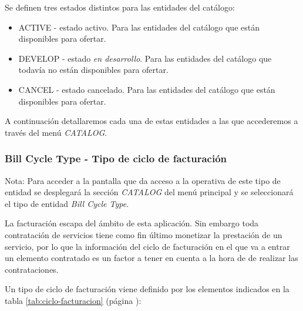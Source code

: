 Se definen tres estados distintos para las entidades del catálogo:

\begin{itemize}
\item ACTIVE - estado activo. Para las entidades del catálogo que están disponibles para ofertar.
\item DEVELOP - estado \textit{en desarrollo}. Para las entidades del catálogo que todavía no están disponibles para ofertar.
\item CANCEL - estado cancelado. Para las entidades del catálogo que están disponibles para ofertar.
\end{itemize}



A continuación detallaremos cada una de estas entidades a las que accederemos a través del menú \emph{CATALOG}.

\subsubsection{Bill Cycle Type - Tipo de ciclo de facturación}
\label{sub:billcycle}

Nota: Para acceder a la pantalla que da acceso a la operativa de este tipo de entidad se desplegará la sección \emph{CATALOG} del menú principal y se seleccionará el tipo de entidad \emph{Bill Cycle Type}.

La facturación escapa del ámbito de esta aplicación. Sin embargo toda contratación de servicios tiene como fin último monetizar la prestación de un servicio, por lo que la información del ciclo de facturación en el que va a entrar un elemento contratado es un factor a tener en cuenta a la hora de de realizar las contrataciones.

Un tipo de ciclo de facturación viene definido por los elementos indicados en la tabla \ref{tab:ciclo-facturacion} (página \pageref{tab:ciclo-facturacion}):




